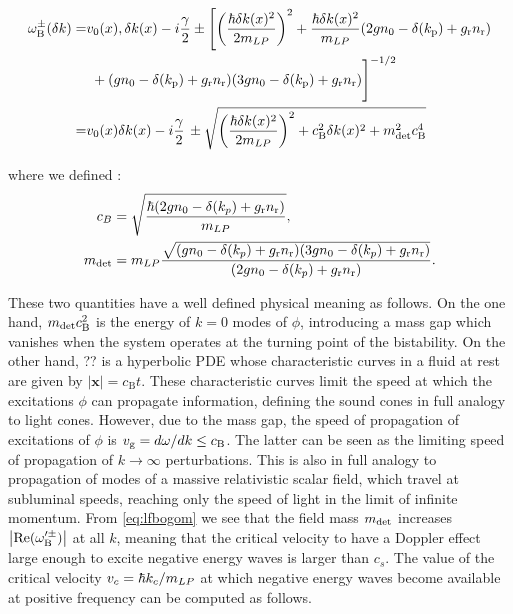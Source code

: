 \begin{align}\label{eq:lfbogom}
    \omega^\pm_\mathrm{B}(\delta k)=&v_0(x) ,\delta k(x)-i\frac{\gamma}{2}\nonumber\pm\Biggl[\left(\frac{\hbar\delta k(x)^2}{2 m_{LP}}\right)^2+\frac{\hbar \delta k(x)^2}{m_{LP}}(2g n_0 - \delta(k_\mathrm{p})+g_\mathrm{r}n_\mathrm{r})\\
    &\,\,+(g n_0 - \delta(k_\mathrm{p})+g_\mathrm{r}n_\mathrm{r})(3 g n_0 - \delta(k_\mathrm{p})+g_\mathrm{r}n_\mathrm{r})\Biggr]^{-1/2}\nonumber\\
    =&v_0(x) \delta k(x)-i\frac{\gamma}{2}\,\pm\sqrt{\left(\frac{\hbar\delta k(x)^2}{2 m_{LP}}\right)^2+c_\mathrm{B}^2\delta k(x)^2+m_{\mathrm{det}}^2c_\mathrm{B}^4}
\end{align}

where we defined :
\begin{subequations}
    \label{eq:m_bog}
    \begin{align}
    c_B & = \sqrt{\dfrac{\hbar(2gn_0- \delta(k_p)+g_\mathrm{r}n_\mathrm{r})}{m_{LP}}},\\
    m_{\mathrm{det}}&=m_{LP}\dfrac{\sqrt{(gn_0- \delta(k_p)+g_\mathrm{r}n_\mathrm{r})(3gn_0- \delta(k_p)+g_\mathrm{r}n_\mathrm{r})}}{(2gn_0- \delta(k_p)+g_\mathrm{r}n_\mathrm{r})}.
    \end{align}
\end{subequations}

These two quantities have a well defined physical meaning as follows. 
On the one hand, $m_{\mathrm{det}} c_\mathrm{B}^2$ is the energy of $k=0$ modes of $\phi$, introducing a mass gap which vanishes when the system operates at the turning point of the bistability.
On the other hand, ?? is a hyperbolic PDE whose characteristic curves in a fluid at rest are given by $|\pmb{x}|=c_\mathrm{B} t$. These characteristic curves  limit the speed at which the excitations $\phi$ can propagate information, defining the sound cones in full analogy to light cones. However, due to the mass gap, the speed of propagation of excitations of $\phi$ is $v_{\rm g}=d\omega/dk\leq c_\mathrm{B}$. 
The latter can be seen as the limiting speed of propagation of $k\to\infty$ perturbations. This is also in full analogy to propagation of modes of a massive relativistic scalar field, which travel at subluminal speeds, reaching only the speed of light in the limit of infinite momentum.
From \autoref{eq:lfbogom} we see that the field mass $m_{\mathrm{det}}$ increases $\abs{\mathrm{Re}(\omega_\mathrm{B}^{\prime\pm})}$ at all $k$, meaning that the critical velocity to have a Doppler effect large enough to excite negative energy  waves is larger than $c_s$.
The value of the critical velocity $v_c=\hbar k_c/m_{LP}$ at which negative energy waves become available at positive frequency can be computed as follows. 


